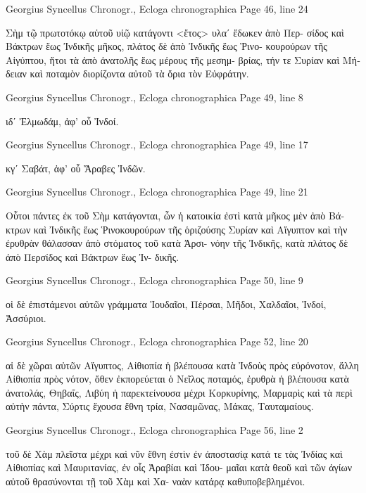 \documentclass[12pt,letterpaper,twoside,final]{memoir}
\begin{document}
\begin{greek}
Georgius Syncellus Chronogr., Ecloga chronographica 
Page 46, line 24

Σὴμ τῷ πρωτοτόκῳ αὐτοῦ υἱῷ κατάγοντι <ἔτος> υλαʹ ἔδωκεν ἀπὸ Περ-
σίδος καὶ Βάκτρων ἕως Ἰνδικῆς μῆκος, πλάτος δὲ ἀπὸ Ἰνδικῆς ἕως Ῥινο-  
κουρούρων τῆς Αἰγύπτου, ἤτοι τὰ ἀπὸ ἀνατολῆς ἕως μέρους τῆς μεσημ-
βρίας, τήν τε Συρίαν καὶ Μήδειαν καὶ ποταμὸν διορίζοντα αὐτοῦ τὰ ὅρια 
τὸν Εὐφράτην. 



Georgius Syncellus Chronogr., Ecloga chronographica 
Page 49, line 8

ιδʹ Ἐλμωδάμ, ἀφ' οὗ Ἰνδοί. 



Georgius Syncellus Chronogr., Ecloga chronographica 
Page 49, line 17

κγʹ Σαβάτ, ἀφ' οὗ Ἄραβες Ἰνδῶν. 



Georgius Syncellus Chronogr., Ecloga chronographica 
Page 49, line 21

Οὗτοι πάντες ἐκ τοῦ Σὴμ κατάγονται, ὧν ἡ κατοικία ἐστὶ κατὰ μῆκος 
μὲν ἀπὸ Βάκτρων καὶ Ἰνδικῆς ἕως Ῥινοκουρούρων τῆς ὁριζούσης Συρίαν   
καὶ Αἴγυπτον καὶ τὴν ἐρυθρὰν θάλασσαν ἀπὸ στόματος τοῦ κατὰ Ἀρσι-
νόην τῆς Ἰνδικῆς, κατὰ πλάτος δὲ ἀπὸ Περσίδος καὶ Βάκτρων ἕως Ἰν-
δικῆς. 



Georgius Syncellus Chronogr., Ecloga chronographica 
Page 50, line 9

                                      οἱ δὲ ἐπιστάμενοι αὐτῶν γράμματα 
Ἰουδαῖοι, Πέρσαι, Μῆδοι, Χαλδαῖοι, Ἰνδοί, Ἀσσύριοι. 



Georgius Syncellus Chronogr., Ecloga chronographica 
Page 52, line 20

                 αἱ δὲ χῶραι αὐτῶν Αἴγυπτος, Αἰθιοπία ἡ βλέπουσα κατὰ 
Ἰνδοὺς πρὸς εὐρόνοτον, ἄλλη Αἰθιοπία πρὸς νότον, ὄθεν ἐκπορεύεται ὁ 
Νεῖλος ποταμός, ἐρυθρὰ ἡ βλέπουσα κατὰ ἀνατολάς, Θηβαΐς, Λιβύη ἡ 
παρεκτείνουσα μέχρι Κορκυρίνης, Μαρμαρὶς καὶ τὰ περὶ αὐτὴν πάντα, 
Σύρτις ἔχουσα ἔθνη τρία, Νασαμῶνας, Μάκας, Ταυταμαίους. 



Georgius Syncellus Chronogr., Ecloga chronographica 
Page 56, line 2

          τοῦ δὲ Χὰμ πλεῖστα μέχρι καὶ νῦν ἔθνη ἐστὶν ἐν ἀποστασίᾳ κατά 
τε τὰς Ἰνδίας καὶ Αἰθιοπίας καὶ Μαυριτανίας, ἐν οἷς Ἀραβίαι καὶ Ἰδου-
μαῖαι κατὰ θεοῦ καὶ τῶν ἁγίων αὐτοῦ θρασύνονται τῇ τοῦ Χὰμ καὶ Χα-
ναὰν κατάρᾳ καθυποβεβλημένοι. 




\end{greek}
\end{document}
